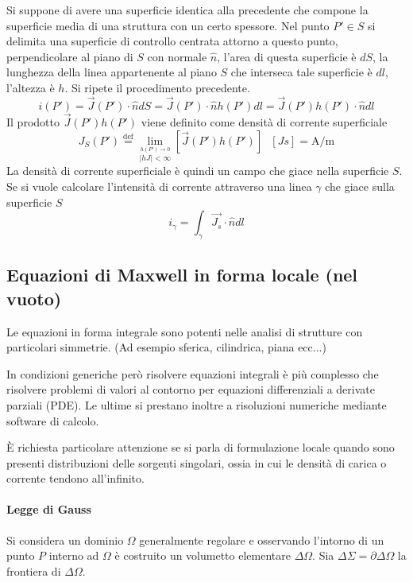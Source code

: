 Si suppone di avere una superficie identica alla precedente che compone la superficie media
di una struttura con un certo spessore. Nel punto $P' \in S$ si delimita una superficie di controllo
centrata attorno a questo punto, perpendicolare al piano di $S$ con normale $\hat{n}$, l'area
di questa superficie è $dS$, la lunghezza della linea appartenente al piano $S$ che interseca tale
superficie è $dl$, l'altezza è $h$. Si ripete il procedimento precedente.
$$
i(P') = \vec{J}(P')\cdot\hat{n}dS = \vec{J}(P')\cdot\hat{n}h(P')dl = \vec{J}(P')h(P')\cdot\hat{n}dl
$$
Il prodotto $\vec{J}(P')h(P')$ viene definito come densità di corrente superficiale 
$$
J_S(P')\stackrel{\text{def}}{=}\lim_{\stackrel{h(P')\to0}{|hJ|<\infty}} [\vec{J}(P')h(P')]\ \ \ [Js] = \si{\ampere/\meter}
$$
La densità di corrente superficiale è quindi un campo che giace nella superficie $S$.
Se si vuole calcolare l'intensità di corrente attraverso una linea $\gamma$ che giace 
sulla superficie $S$
$$
i_\gamma = \int_\gamma \vec{J_s}\cdot \hat{n} dl
$$

\subsection{Equazioni di Maxwell in forma locale (nel vuoto)}
Le equazioni in forma integrale sono potenti nelle analisi di strutture con particolari simmetrie.
(Ad esempio sferica, cilindrica, piana ecc...)

In condizioni generiche però risolvere equazioni integrali è più complesso che risolvere problemi di 
valori al contorno per equazioni differenziali a derivate parziali (PDE).
Le ultime si prestano inoltre a risoluzioni numeriche mediante software di calcolo.

È richiesta particolare attenzione se si parla di formulazione locale quando sono presenti
distribuzioni delle sorgenti singolari, ossia in cui le densità di carica o corrente tendono 
all'infinito.

\paragraph{Legge di Gauss}
Si considera un dominio $\Omega$ generalmente regolare e osservando l'intorno di
un punto $P$ interno ad $\Omega$ è costruito un volumetto elementare $\Delta\Omega$.
Sia $\Delta\Sigma = \partial\Delta\Omega$ la frontiera di $\Delta\Omega$.

